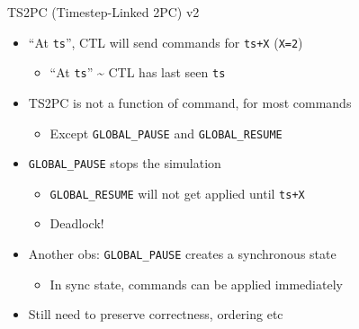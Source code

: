 \documentclass[
  ignorenonframetext,
]{beamer}
\providecommand{\tightlist}{%
  \setlength{\itemsep}{0pt}\setlength{\parskip}{0pt}}\usepackage{longtable,booktabs,array}
\begin{document}
\begin{frame}[fragile]{TS2PC (Timestep-Linked 2PC) v2}
\label{ts2pc-timestep-linked-2pc-v2}
\begin{itemize}
\tightlist
\item
  ``At \texttt{ts}'', CTL will send commands for \texttt{ts+X}
  (\texttt{X=2})

  \begin{itemize}
  \tightlist
  \item
    ``At \texttt{ts}'' \textasciitilde{} CTL has last seen \texttt{ts}
  \end{itemize}
\item
  TS2PC is not a function of command, for most commands

  \begin{itemize}
  \tightlist
  \item
    Except \texttt{GLOBAL\_PAUSE} and \texttt{GLOBAL\_RESUME}
  \end{itemize}
\end{itemize}

\pause

\begin{itemize}
\tightlist
\item
  \texttt{GLOBAL\_PAUSE} stops the simulation

  \begin{itemize}
  \tightlist
  \item
    \texttt{GLOBAL\_RESUME} will not get applied until \texttt{ts+X}
  \item
    Deadlock!
  \end{itemize}
\end{itemize}

\pause

\begin{itemize}
\tightlist
\item
  Another obs: \texttt{GLOBAL\_PAUSE} creates a synchronous state

  \begin{itemize}
  \tightlist
  \item
    In sync state, commands can be applied immediately
  \end{itemize}
\end{itemize}

\pause

\begin{itemize}
\tightlist
\item
  Still need to preserve correctness, ordering etc
\end{itemize}
\end{frame}
\end{document}

